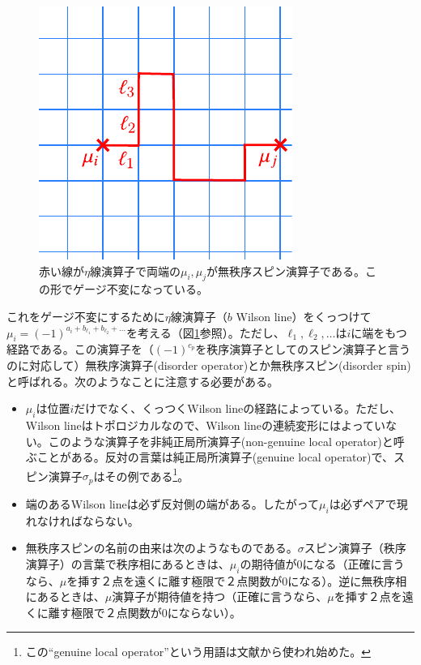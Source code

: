 \documentclass[a4paper,12pt,dvipdfmx]{jlreq}
\begin{document}
\begin{figure}
  \centering
  \includegraphics{disorder.pdf}
  \caption{赤い線が$\eta$線演算子で両端の$\mu_i,\mu_j$が無秩序スピン演算子である。この形でゲージ不変になっている。}
  \label{fig:disorder}
\end{figure}

これをゲージ不変にするために$\eta$線演算子（$b$ Wilson line）をくっつけて
$\mu_i=(-1)^{a_i+b_{\ell_1}+b_{\ell_2}+\dots}$を考える（図\ref{fig:disorder}参照）。ただし、$\ell_1,\ell_2,\dots$は$i$に端をもつ経路である。この演算子を（$(-1)^{c_p}$を秩序演算子としてのスピン演算子と言うのに対応して）無秩序演算子(disorder operator)とか無秩序スピン(disorder spin)と呼ばれる。次のようなことに注意する必要がある。
\begin{itemize}
  \item $\mu_i$は位置$i$だけでなく、くっつくWilson lineの経路によっている。ただし、Wilson lineはトポロジカルなので、Wilson lineの連続変形にはよっていない。このような演算子を非純正局所演算子(non-genuine local operator)と呼ぶことがある。反対の言葉は純正局所演算子(genuine local operator)で、スピン演算子$\sigma_{p}$はその例である\footnote{この``genuine local operator''という用語は文献\cite{Kapustin:2014gua}から使われ始めた。}。
  \item 端のあるWilson lineは必ず反対側の端がある。したがって$\mu_i$は必ずペアで現れなければならない。
  \item 無秩序スピンの名前の由来は次のようなものである。$\sigma$スピン演算子（秩序演算子）の言葉で秩序相にあるときは、$\mu_i$の期待値が$0$になる（正確に言うなら、$\mu$を挿す２点を遠くに離す極限で２点関数が$0$になる）。逆に無秩序相にあるときは、$\mu$演算子が期待値を持つ（正確に言うなら、$\mu$を挿す２点を遠くに離す極限で２点関数が$0$にならない）。
\end{itemize}
\end{document}
